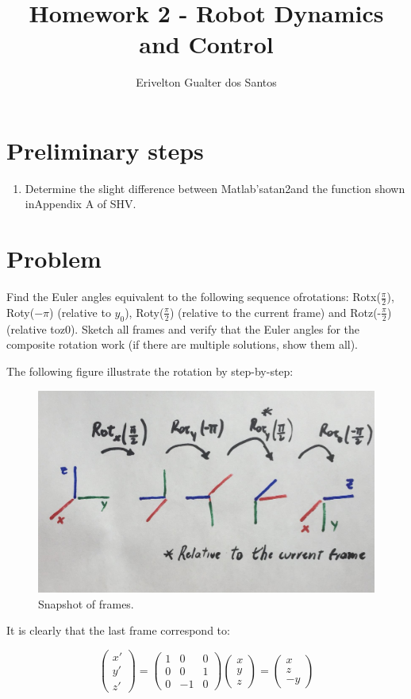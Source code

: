 \documentclass[a4paper,10pt]{article}
\title{Homework 2 - Robot Dynamics and Control}
\author{Erivelton Gualter dos Santos}
\begin{document}
\date{}
\maketitle

\section*{Preliminary steps}

\begin{enumerate}
 \item Determine the slight difference between Matlab’satan2and the function shown inAppendix A of SHV.
\end{enumerate}

\section{Problem}

Find the Euler angles equivalent to the following sequence ofrotations: Rotx($\frac{\pi}{2}$), Roty($-\pi$) (relative to $y_0$), Roty($\frac{\pi}{2}$) (relative to the current frame) and Rotz(-$\frac{\pi}{2}$) (relative toz0). Sketch all frames and verify that the Euler angles for the composite rotation work (if there are multiple solutions, show them all).

\hfill \break

The following figure illustrate the rotation by step-by-step:

\begin{figure}[H] \label{fig:frames}
 \centering
 \includegraphics[width=0.7\linewidth]{pb1.jpeg}
 \caption{Snapshot of frames.}
\end{figure}

It is clearly that the last frame correspond to:

$$\left(\begin{array}{c} x'\\ y'\\ z' \end{array}\right)  = \left(\begin{array}{ccc} 1 & 0 & 0\\ 0 & 0 & 1\\ 0 & -1 & 0 \end{array}\right)\left(\begin{array}{c} x\\ y\\ z \end{array}\right) = \left(\begin{array}{c} x\\ z\\ -y \end{array}\right)$$
\end{document}
